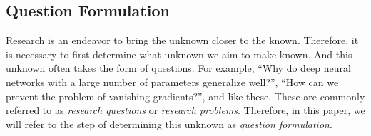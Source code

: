 \documentclass{book}
\begin{document}






\subsection{Question Formulation}
Research is an endeavor to bring the unknown closer to the known. Therefore, it is necessary to first determine what unknown we aim to make known. And this unknown often takes the form of questions. For example, ``Why do deep neural networks with a large number of parameters generalize well?'', ``How can we prevent the problem of vanishing gradients?'', and like these. These are commonly referred to as \textit{research questions} or \textit{research problems}. Therefore, in this paper, we will refer to the step of determining this unknown as \textit{question formulation}.
\end{document}
